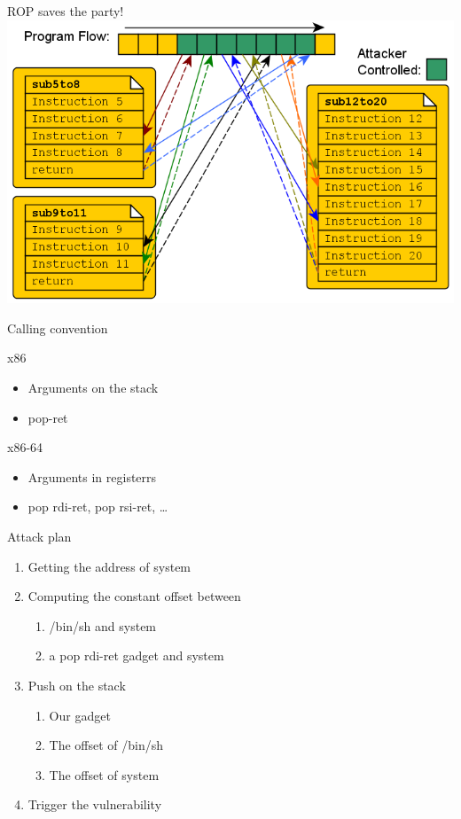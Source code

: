 \documentclass{beamer}
\begin{document}
\begin{frame}{ROP saves the party!}
    \includegraphics[width=\textwidth]{rop.png}
\end{frame}

\begin{frame}{Calling convention}
    \begin{block}{x86}
        \begin{itemize}
            \item Arguments on the stack
            \item pop-ret
        \end{itemize}
    \end{block}
    \begin{block}{x86-64}
        \begin{itemize}
            \item Arguments in registerrs
            \item pop rdi-ret, pop rsi-ret, \dots
        \end{itemize}
    \end{block}
\end{frame}

\begin{frame}{Attack plan}
    \begin{enumerate}
        \item Getting the address of \alert{system}
        \item Computing the constant offset between
            \begin{enumerate}
                \item \alert{/bin/sh} and \alert{system}
                \item a \alert{pop rdi-ret} gadget and \alert{system}
            \end{enumerate}
        \item Push on the stack
            \begin{enumerate}
                \item Our \alert{gadget}
                \item The offset of \alert{/bin/sh}
                \item The offset of \alert{system}
            \end{enumerate}
        \item Trigger the vulnerability
    \end{enumerate}
\end{frame}
\end{document}
